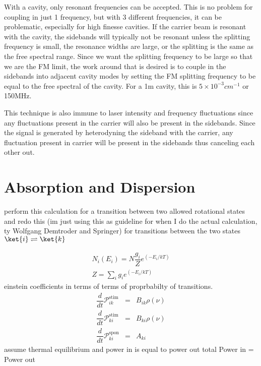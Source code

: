 \documentclass[11pt,a4paper]{book}
\begin{document}
		With a cavity, only resonant frequencies can be accepted. This is no problem for coupling in just 1 frequency, but with 3 different frequencies, it can be problematic, especially for high finesse cavities.  If the carrier beam is resonant with the cavity, the sidebands will typically not be resonant unless the splitting frequency is small, the resonance widths are large, or the splitting is the same as the free spectral range. Since we want the splitting frequency to be large so that we are the FM limit, the work around that is desired is to couple in the sidebands into adjacent cavity modes by setting the FM splitting frequency to be equal to the free spectral of the cavity. For a 1m cavity, this is $5\times 10^{-3} cm^{-1}$ or 150MHz.
		
		This technique is also immune to laser intensity and frequency fluctuations since any fluctuations present in the carrier will also be present in the sidebands. Since the signal is generated by heterodyning the sideband with the carrier, any fluctuation present in carrier will be present in the sidebands thus canceling each other out.

\chapter{Absorption and Dispersion}
\label{chp:Absorption and Dispersion}
perform this calculation for a transition between two allowed rotational states and redo this (im just using this as guideline for when I do the actual calculation, ty Wolfgang Demtroder and Springer)
for transitions between the two states $\ket{i} \rightleftharpoons \ket{k}$

\begin{eqnarray}
N_i(E_i) = N \dfrac{g_i}{Z}
e^{\left(-E_i/kT\right)}
\\
Z=\sum_i{g_ie^{\left(-E_i/kT\right)}}
\end{eqnarray}
einstein coefficients in terms of terms of proprbabilty of transitions.
\begin{eqnarray}
\dfrac{d}{dt} \mathcal{P}_{ik}^{\mathrm{stim}} & = & B_{ik}\rho({\nu}) 
\\
\dfrac{d}{dt} \mathcal{P}_{ki}^{\mathrm{stim}} & = & B_{ki}\rho({\nu}) 
\\
\dfrac{d}{dt} \mathcal{P}_{ki}^{\mathrm{spon}} & = & A_{ki} 
\end{eqnarray}
assume thermal equilibrium and power in is equal to power out total Power in = Power out
\end{document}
